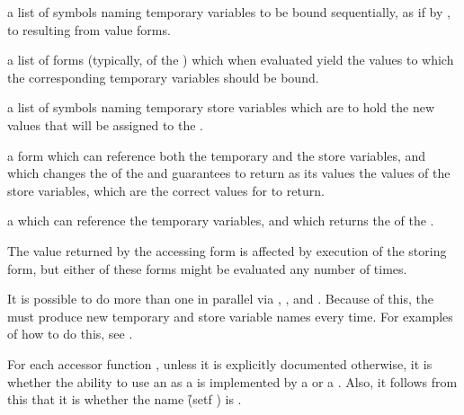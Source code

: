 \beginlist

a list of symbols naming temporary variables to be bound
sequentially, as if by , to  
resulting from value forms.
     

a list of forms (typically,  of the
) which when evaluated 
yield the values to which the corresponding temporary 
variables should be bound.


a list of symbols naming temporary store variables which are
to hold the new values that will be assigned to the
.


a form which can reference both the temporary and the store variables,
and which changes the  of the 
and guarantees to return as its values the values of the store variables,
which are the correct values for  to return.


a  which can reference the temporary variables,
and which returns the  of the .
\endlist

The value returned by the accessing form is
affected by execution of the storing form, but either of these
forms might be evaluated any number of times.



It is possible
to do more than one  in parallel via
, , and .  
Because of this, the 
must produce new temporary 
and store variable names every time.  For examples of how to do this,
see .

For each  accessor function ,
unless it is explicitly documented otherwise,
it is  whether the ability to 
use an   as a  
is implemented by a  or a .
Also, it follows from this that it is  
whether the name \f{(setf )} is .

